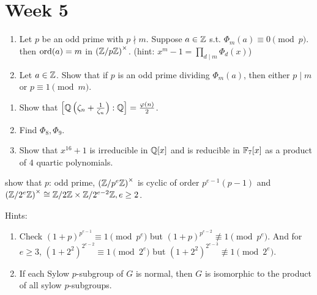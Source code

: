 
\section{Week 5}

\begin{exercise} \mbox{}
  \begin{enumerate}
    \item Let $p$ be an odd prime with $p \nmid m$.
      Suppose $a \in \mathbb{Z}$ s.t. $\Phi_m(a) \equiv 0 \pmod p$. then
      $\operatorname{ord}(a) = m$ in $\left({\mathbb{Z}}/{p\mathbb{Z}}\right)^\times$.
      (hint: $x^m - 1 = \prod_{d\mid m} \Phi_d(x)$)
    \item Let $a\in \mathbb{Z}$. Show that if $p$ is an odd prime dividing $\Phi_m(a)$,
      then either $p \mid m$ or $p \equiv 1 \pmod m$.
  \end{enumerate}
\end{exercise}

\begin{exercise} \mbox{}
  \begin{enumerate}
    \item Show that $\left[\mathbb{Q}\left(\zeta_n + \frac{1}{\zeta_n}\right) : \mathbb{Q}\right]
      = \frac{\varphi(n)}{2}$.
    \item Find $\Phi_8, \Phi_9$.
    \item Show that $x^{16} + 1$ is irreducible in $\mathbb{Q}[x]$ and is reducible
      in $\mathbb{F}_7[x]$ as a product of $4$ quartic polynomials.
  \end{enumerate}
\end{exercise}

\begin{exercise}
  show that $p$: odd prime, $\left({\mathbb{Z}}/{p^e\mathbb{Z}}\right)^\times$ is cyclic
  of order $p^{e-1}(p-1)$ and $\left({\mathbb{Z}}/{2^e\mathbb{Z}}\right)^\times \cong
  {\mathbb{Z}}/{2\mathbb{Z}} \times {\mathbb{Z}}/{2^{e-2}\mathbb{Z}}, e\ge 2$.
  
  Hints:
  \begin{enumerate}
    \item Check $(1+p)^{p^{e-1}} \equiv 1 \pmod{p^e}$ but
      $(1+p)^{p^{e-2}} \not\equiv 1 \pmod{p^e}$. And for $e \ge 3$,
      $(1+2^2)^{2^{e-2}} \equiv 1 \pmod{2^e}$ but
      $(1+2^2)^{2^{e-3}} \not\equiv 1 \pmod{2^e}$.
    \item If each Sylow $p$-subgroup of $G$ is normal, then $G$ is isomorphic
      to the product of all sylow $p$-subgroups.
  \end{enumerate}
\end{exercise}

